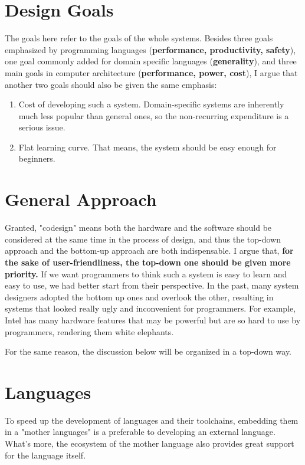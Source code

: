 \documentclass[11pt]{article}
\begin{document}
\section{Design Goals}
The goals here refer to the goals of the whole systems. Besides three goals emphasized by programming languages (\textbf{performance, productivity, safety}), one goal commonly added for domain specific languages (\textbf{generality}), and three main goals in computer architecture (\textbf{performance, power, cost}), I argue that another two goals should also be given the same emphasis:
\begin{enumerate}
    \item Cost of developing such a system.
    Domain-specific systems are inherently much less popular than general ones, so the non-recurring expenditure is a serious issue.
    \item Flat learning curve.
    That means, the system should be easy enough for beginners.
\end{enumerate}

\section{General Approach}
Granted, "codesign" means both the hardware and the software should be considered at the same time in the process of design, and thus the top-down approach and the bottom-up approach are both indispensable.
I argue that, \textbf{for the sake of user-friendliness, the top-down one should be given more priority.}
If we want programmers to think such a system is easy to learn and easy to use, we had better start from their perspective.
In the past, many system designers adopted the bottom up ones and overlook the other, resulting in systems that looked really ugly and inconvenient for programmers.
For example, Intel has many hardware features that may be powerful but are so hard to use by programmers, rendering them white elephants.

For the same reason, the discussion below will be organized in a top-down way.

\section{Languages}
To speed up the development of languages and their toolchains, embedding them in a "mother languages" is a preferable to developing an external language.
What's more, the ecosystem of the mother language also provides great support for the language itself.
\end{document}
